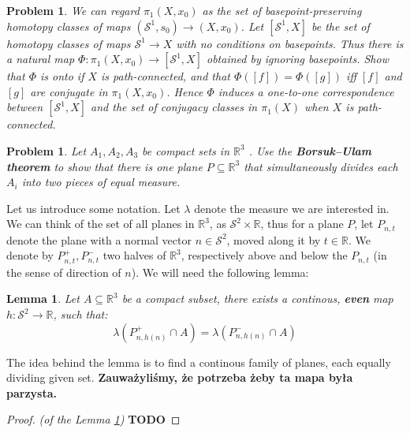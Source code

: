 \documentclass[11pt, a4paper, final]{amsart}
\newcommand{\R}{{\mathbb{R}}}
\newcommand\todo[1]{\textbf{\textcolor{redd}{#1}}}
\newcommand{\sphere}{\mathcal{S}}
\numberwithin{theorem}{section}
\newtheorem{lemma}[theorem]{Lemma}
\newtheorem{problem}[theorem]{Problem}
\theoremstyle{definition}
\theoremstyle{remark}
\begin{document}
\begin{problem}\label{problem: 1.1.6}
    We can regard $\pi_1(X, x_0)$ as the set of basepoint-preserving homotopy classes of maps $(\sphere^1, s_0) \rightarrow (X, x_0)$. Let $[\sphere^1, X]$ be the set of homotopy classes of maps $\sphere^1 \rightarrow X$ with no conditions on basepoints. Thus there is a natural map $\Phi : \pi_1(X, x_0) \rightarrow [\sphere^1, X]$ obtained by ignoring basepoints. Show that $\Phi$ is onto if $X$ is path-connected, and that $\Phi([f]) = \Phi([g])$ iff $[f]$ and $[g]$ are conjugate in $\pi_1(X, x_0)$. Hence $\Phi$ induces a one-to-one correspondence between $[\sphere^1, X]$ and the set of conjugacy classes in $\pi_1(X)$ when $X$ is path-connected.
\end{problem}

\begin{problem}\label{problem: 1.1.9}
    Let $A_1 , A_2 , A_3$ be compact sets in $\R^3$ . Use the \textbf{Borsuk–Ulam theorem} to show
that there is one plane $P \subseteq \R^3$ that simultaneously divides each $A_i$ into two pieces of
equal measure.
\end{problem}

Let us introduce some notation. Let $\lambda$ denote the measure we are interested in. We can think of the set of all planes in $\R^3$, as $\sphere^2\times\R$, thus for a plane $P$, let $P_{n, t}$ denote the plane with a normal vector $n \in \mathcal{S}^2$, moved along it by $t \in \R$. We denote by $P^+_{n, t}, P^-_{n, t}$ two halves of $\R^3$, respectively above and below the $P_{n, t}$ (in the sense of direction of $n$). We will need the following lemma:

\begin{lemma}\label{lemma: about continous equal-cutting}
    Let $A \subseteq \R^3$ be a compact subset, there exists a continous, \textbf{even} map $h : \sphere^2 \xrightarrow{} \R$, such that:
    $$\lambda(P^+_{n, h(n)} \cap A) = \lambda(P^-_{n, h(n)} \cap A)$$
\end{lemma}

The idea behind the lemma is to find a continous family of planes, each equally dividing given set.
\todo{Zauważyliśmy, że potrzeba żeby ta mapa była parzysta.}

\begin{proof}\textit{(of the Lemma \ref{lemma: about continous equal-cutting})}
    \todo{TODO}
\end{proof}
\end{document}
